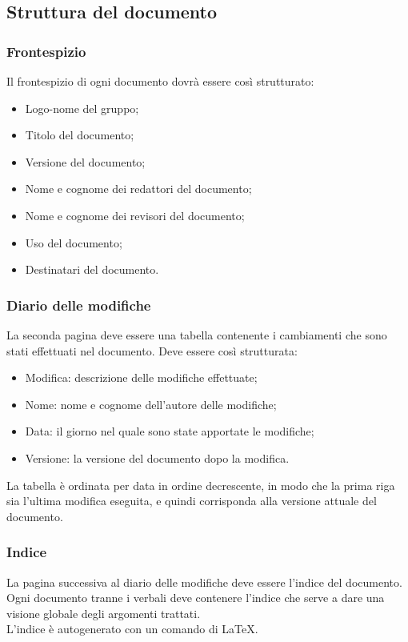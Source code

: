\documentclass[12pt,a4paper,titlepage]{article}
\begin{document}
\subsection{Struttura del documento}
\subsubsection{Frontespizio}
Il frontespizio di ogni documento dovrà essere così strutturato:
\begin{itemize}
	\item Logo-nome del gruppo;
	\item Titolo del documento;
	\item Versione del documento;
	\item Nome e cognome dei redattori del documento;
	\item Nome e cognome dei revisori del documento;
	\item Uso del documento;
	\item Destinatari del documento.
\end{itemize}

\subsubsection{Diario delle modifiche}
La seconda pagina deve essere una tabella contenente i cambiamenti che sono stati 
effettuati nel documento. Deve essere così strutturata:
\begin{itemize}
	\item Modifica: descrizione delle modifiche effettuate;
	\item Nome: nome e cognome dell'autore delle modifiche;
	\item Data: il giorno nel quale sono state apportate le modifiche;
	\item Versione: la versione del documento dopo la modifica.
\end{itemize}
La tabella è ordinata per data in ordine decrescente, in modo che la prima riga 
sia l'ultima modifica eseguita, e quindi corrisponda alla versione attuale del documento.

\subsubsection{Indice}
La pagina successiva al diario delle modifiche deve essere l'indice del documento.
Ogni documento tranne i verbali deve contenere l'indice che serve a dare una visione globale degli argomenti trattati.\\
L'indice è autogenerato con un comando di \LaTeX .
\end{document}
